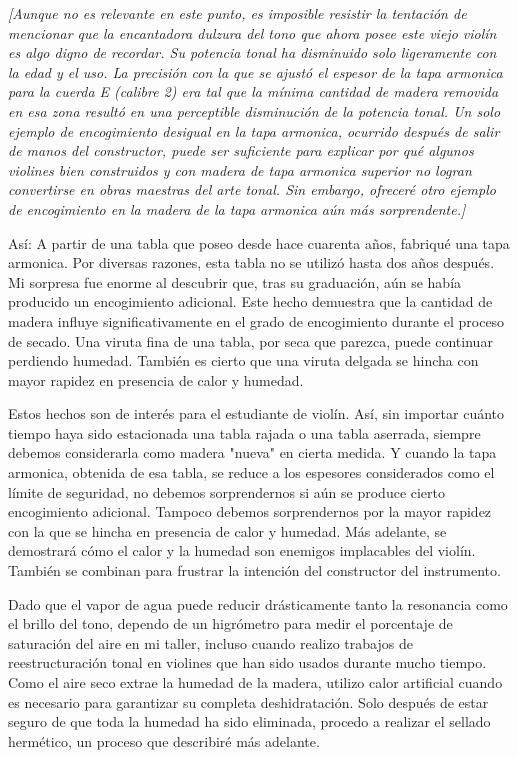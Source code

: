 \documentclass[12pt]{book}
\begin{document}
\textit{[Aunque no es relevante en este punto, es imposible resistir la tentación de mencionar que la encantadora dulzura del tono que ahora posee este viejo violín es algo digno de recordar. Su potencia tonal ha disminuido solo ligeramente con la edad y el uso. La precisión con la que se ajustó el espesor de la tapa armonica para la cuerda E (calibre 2) era tal que la mínima cantidad de madera removida en esa zona resultó en una perceptible disminución de la potencia tonal. Un solo ejemplo de encogimiento desigual en la tapa armonica, ocurrido después de salir de manos del constructor, puede ser suficiente para explicar por qué algunos violines bien construidos y con madera de tapa armonica superior no logran convertirse en obras maestras del arte tonal. Sin embargo, ofreceré otro ejemplo de encogimiento en la madera de la tapa armonica aún más sorprendente.]}

Así: A partir de una tabla que poseo desde hace cuarenta años, fabriqué una tapa armonica. Por diversas razones, esta tabla no se utilizó hasta dos años después. Mi sorpresa fue enorme al descubrir que, tras su graduación, aún se había producido un encogimiento adicional. Este hecho demuestra que la cantidad de madera influye significativamente en el grado de encogimiento durante el proceso de secado. Una viruta fina de una tabla, por seca que parezca, puede continuar perdiendo humedad. También es cierto que una viruta delgada se hincha con mayor rapidez en presencia de calor y humedad. 

Estos hechos son de interés para el estudiante de violín. Así, sin importar cuánto tiempo haya sido estacionada una tabla rajada o una tabla aserrada, siempre debemos considerarla como madera "nueva" en cierta medida. Y cuando la tapa armonica, obtenida de esa tabla, se reduce a los espesores considerados como el límite de seguridad, no debemos sorprendernos si aún se produce cierto encogimiento adicional. Tampoco debemos sorprendernos por la mayor rapidez con la que se hincha en presencia de calor y humedad. Más adelante, se demostrará cómo el calor y la humedad son enemigos implacables del violín. También se combinan para frustrar la intención del constructor del instrumento.

Dado que el vapor de agua puede reducir drásticamente tanto la resonancia como el brillo del tono, dependo de un higrómetro para medir el porcentaje de saturación del aire en mi taller, incluso cuando realizo trabajos de reestructuración tonal en violines que han sido usados durante mucho tiempo. Como el aire seco extrae la humedad de la madera, utilizo calor artificial cuando es necesario para garantizar su completa deshidratación. Solo después de estar seguro de que toda la humedad ha sido eliminada, procedo a realizar el sellado hermético, un proceso que describiré más adelante.
\end{document}
